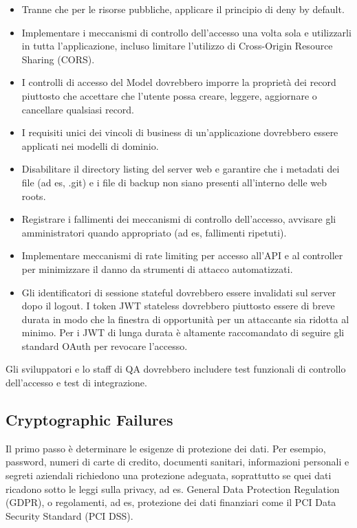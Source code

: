 \begin{itemize}
    \item Tranne che per le risorse pubbliche, applicare il principio di deny by default.
    \item Implementare i meccanismi di controllo dell'accesso una volta sola e utilizzarli in tutta l'applicazione, incluso limitare l'utilizzo di Cross-Origin Resource Sharing (CORS).
    \item I controlli di accesso del Model dovrebbero imporre la proprietà dei record piuttosto che accettare che l'utente possa creare, leggere, aggiornare o cancellare qualsiasi record.
    \item I requisiti unici dei vincoli di business di un'applicazione dovrebbero essere applicati nei modelli di dominio.
    \item Disabilitare il directory listing del server web e garantire che i metadati dei file (ad es, .git) e i file di backup non siano presenti all'interno delle web roots.
    \item Registrare i fallimenti dei meccanismi di controllo dell'accesso, avvisare gli amministratori quando appropriato (ad es, fallimenti ripetuti).
    \item Implementare meccanismi di rate limiting per accesso all'API e al controller per minimizzare il danno da strumenti di attacco automatizzati.
    \item Gli identificatori di sessione stateful dovrebbero essere invalidati sul server dopo il logout. I token JWT stateless dovrebbero piuttosto essere di breve durata in modo che la finestra di opportunità per un attaccante sia ridotta al minimo. Per i JWT di lunga durata è altamente raccomandato di seguire gli standard OAuth per revocare l'accesso.
\end{itemize}

Gli sviluppatori e lo staff di QA dovrebbero includere test funzionali di controllo dell'accesso e test di integrazione.
\subsection{Cryptographic Failures} 
Il primo passo è determinare le esigenze di protezione dei dati. Per esempio, password, numeri di carte di credito, documenti sanitari, informazioni personali e segreti aziendali richiedono una protezione adeguata, soprattutto se quei dati ricadono sotto le leggi sulla privacy, ad es. General Data Protection Regulation (GDPR), o regolamenti, ad es, protezione dei dati finanziari come il PCI Data Security Standard (PCI DSS). 

